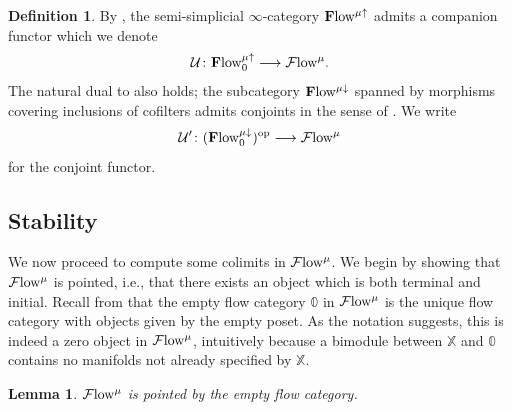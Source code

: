 \documentclass[10pt]{amsart}
\numberwithin{equation}{section}
\newtheorem{lem}[prop]{Lemma}
\theoremstyle{definition}
\newtheorem{definition}[prop]{Definition}
\DeclareMathOperator{\op}{op}
\newcommand{\Flow}{\cF\mathrm{low}\vphantom{w}}
\newcommand{\bfFlow}{\mathbf{F}\mathrm{low}\vphantom{w}}
\newcommand{\bX}{\mathbb{X}}
\newcommand{\bZero}{\mathbb{0}}
\newcommand{\cF}{\mathcal{F}}
\newcommand{\cU}{\mathcal{U}}
\renewcommand{\to}{\mathchoice{\longrightarrow}{\rightarrow}{}{}}
\begin{document}
\begin{definition}\label{def:flow_companion}
	By , the semi-simplicial $\infty$-category $\bfFlow^{\mu \uparrow}$ admits a companion functor which we denote
	\begin{align*}
		\cU\colon \bfFlow^{\mu\uparrow}_{0} \to \Flow^{\mu}.
	\end{align*}
	The natural dual to  also holds; the subcategory $\bfFlow^{\mu\downarrow}$ spanned by morphisms covering inclusions of cofilters admits conjoints in the sense of .
  We write
	\begin{align*}
		\cU' \colon (\bfFlow^{\mu\downarrow}_{0})^{\op} \to \Flow^{\mu}
	\end{align*}
	for the conjoint functor.
\end{definition}


\subsection{Stability}\label{subsec:stability}

We now proceed to compute some colimits in $\Flow^{\mu}$. We begin by showing that $\Flow^{\mu}$ is pointed, i.e., that there exists an object which is both terminal and initial.
Recall from  that the empty flow category $\bZero$ in $\Flow^{\mu}$ is the unique flow category with objects given by the empty poset.
As the notation suggests, this is indeed a zero object in $\Flow^{\mu}$, intuitively because a bimodule between $\bX$ and $\bZero$ contains no manifolds not already specified by $\bX$.

\begin{lem}\label{lem:flow_is_pointed}
	$\Flow^{\mu}$ is pointed by the empty flow category.
\end{lem}
\end{document}
